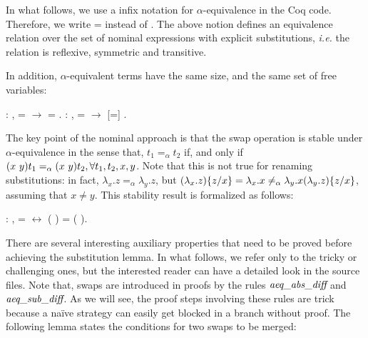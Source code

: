 In what follows, we use a infix notation for $\alpha$-equivalence in the Coq code. Therefore, we write  =  instead of   . The above notion defines an equivalence relation over the set  of nominal expressions with explicit substitutions, {\it i.e.} the  relation is reflexive, symmetric and transitive. 
\begin{coqdoccode}
\end{coqdoccode}
In addition, $\alpha$-equivalent terms have the same size, and the same set of free variables: 
\begin{coqdoccode}
\coqdocemptyline
\coqdocnoindent
{} : \coqdockw{\ensuremath{\forall}}  ,  =  \ensuremath{\rightarrow}   =  .\coqdoceol
\coqdocnoindent
{}  : \coqdockw{\ensuremath{\forall}}  ,  =  \ensuremath{\rightarrow}   [=]  .\coqdoceol
\coqdocemptyline
\end{coqdoccode}
The key point of the nominal approach is that the swap operation is stable under $\alpha$-equivalence in the sense that, $t_1 =_\alpha t_2$ if, and only if $(x\ y) t_1 =_\alpha (x\ y) t_2, \forall t_1, t_2, x, y$. Note that this is not true for renaming substitutions: in fact, $\lambda_x.z =_\alpha \lambda_y.z$, but $(\lambda_x.z)\{z / x\} = \lambda_x.x \neq_\alpha \lambda_y.x (\lambda_y.z)\{z / x\}$, assuming that $x \neq y$. This stability result is formalized as follows: 
\begin{coqdoccode}
\coqdocemptyline
\coqdocnoindent
{} : \coqdockw{\ensuremath{\forall}}    ,  =  \ensuremath{\leftrightarrow} (   ) = (   ).\coqdoceol
\coqdocemptyline
\coqdocemptyline
\end{coqdoccode}
There are several interesting auxiliary properties that need to be proved before achieving the substitution lemma. In what follows, we refer only to the tricky or challenging ones, but the interested reader can have a detailed look in the source files. Note that, swaps are introduced in proofs by the rules $\mbox{\it aeq}\_\mbox{\it abs}\_\mbox{\it diff}$ and $\mbox{\it aeq}\_\mbox{\it sub}\_\mbox{\it diff}$. As we will see, the proof steps involving these rules are trick because a naïve strategy can easily get blocked in a branch without proof. The following lemma states the conditions for two swaps to be merged: 
